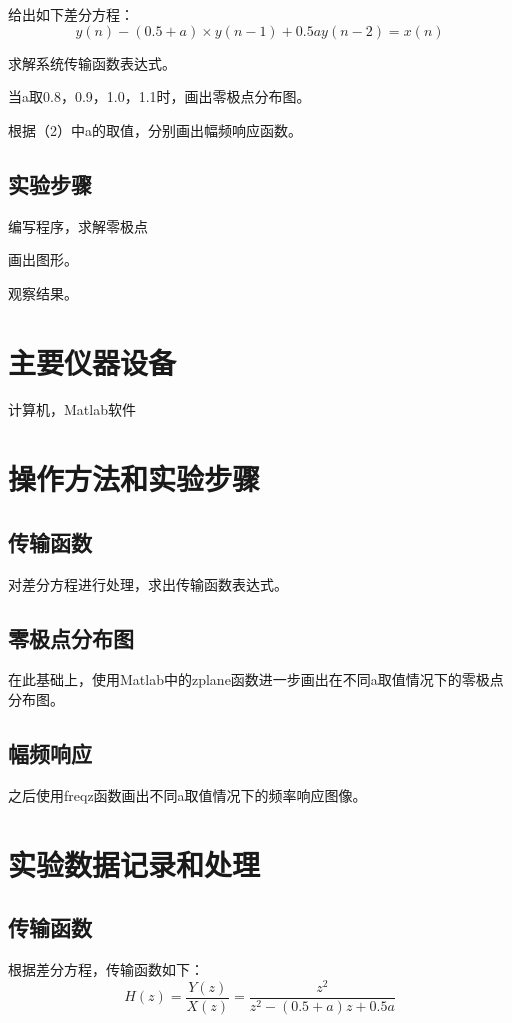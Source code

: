 \documentclass{zjureport}
\begin{document}
    给出如下差分方程：
    $$y(n) - (0.5+a)\times y(n-1) + 0.5ay(n-2) = x(n)$$
    \begin{clause}
      \item 求解系统传输函数表达式。
      \item 当a取0.8，0.9，1.0，1.1时，画出零极点分布图。
      \item 根据（2）中a的取值，分别画出幅频响应函数。
    \end{clause}

  \subsection{实验步骤}
    \begin{clause}
      \item 编写程序，求解零极点
      \item 画出图形。
      \item 观察结果。
    \end{clause}

\section{主要仪器设备}
  计算机，Matlab软件

\section{操作方法和实验步骤}
  \subsection{传输函数}
    对差分方程进行处理，求出传输函数表达式。
  \subsection{零极点分布图}
    在此基础上，使用Matlab中的zplane函数进一步画出在不同a取值情况下的零极点分布图。
  \subsection{幅频响应}
    之后使用freqz函数画出不同a取值情况下的频率响应图像。

\section{实验数据记录和处理}
  \subsection{传输函数}
    根据差分方程，传输函数如下：
    $$H(z) = \frac{Y(z)}{X(z)} = \frac{z^2}{z^2-(0.5+a)z+0.5a}$$
\end{document}
